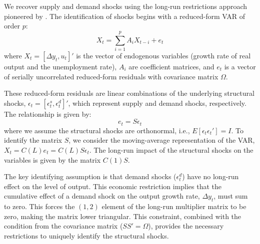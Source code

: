 \documentclass[12pt, a4paper]{article}
\begin{document}
We recover supply and demand shocks using the long-run restrictions approach pioneered by \textcite{blanchard1989dynamic}. The identification of shocks begins with a reduced-form VAR of order $p$:
\begin{equation} \label{eq:var_reduced}
X_t = \sum_{i=1}^{p} A_i X_{t-i} + e_t
\end{equation}
where $X_t = [\Delta y_t, u_t]'$ is the vector of endogenous variables (growth rate of real output and the unemployment rate), $A_i$ are coefficient matrices, and $e_t$ is a vector of serially uncorrelated reduced-form residuals with covariance matrix $\Omega$.

These reduced-form residuals are linear combinations of the underlying structural shocks, $\epsilon_t = [\epsilon^s_t, \epsilon^d_t]'$, which represent supply and demand shocks, respectively. The relationship is given by:
\begin{equation} \label{eq:shocks_relation}
e_t = S\epsilon_t
\end{equation}
where we assume the structural shocks are orthonormal, i.e., $E[\epsilon_t \epsilon_t'] = I$. To identify the matrix $S$, we consider the moving-average representation of the VAR, $X_t = C(L)e_t = C(L)S\epsilon_t$. The long-run impact of the structural shocks on the variables is given by the matrix $C(1)S$.

The key identifying assumption is that demand shocks ($\epsilon^d_t$) have no long-run effect on the level of output. This economic restriction implies that the cumulative effect of a demand shock on the output growth rate, $\Delta y_t$, must sum to zero. This forces the $(1,2)$ element of the long-run multiplier matrix to be zero, making the matrix lower triangular. This constraint, combined with the condition from the covariance matrix ($SS' = \Omega$), provides the necessary restrictions to uniquely identify the structural shocks.
\end{document}
